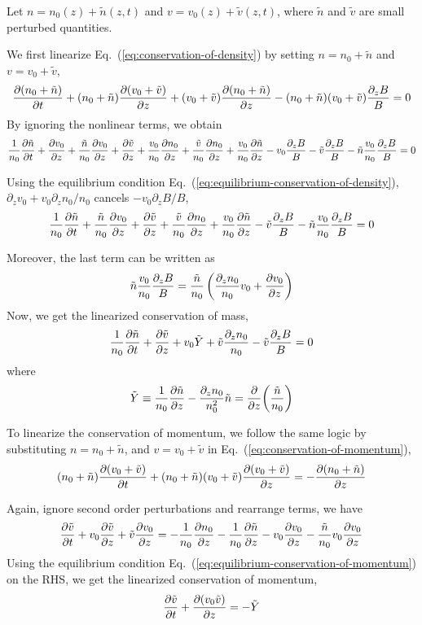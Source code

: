 Let $n = n_0(z) + \tilde{n}(z,t)$ and $v = v_0(z) + \tilde{v}(z,t)$, where $\tilde{n}$ and $\tilde{v}$ are small perturbed quantities.

We first linearize Eq.~(\ref{eq:conservation-of-density}) by setting $n=n_0+\tilde{n}$ and $v=v_0+\tilde{v}$,
\[    \pdv{(n_0+\tilde{n})}{t}
	+ (n_0+\tilde{n})\pdv{(v_0+\tilde{v})}{z}
	+ (v_0+\tilde{v})\pdv{(n_0+\tilde{n})}{z}
	- (n_0+\tilde{n})(v_0+\tilde{v})\frac{\partial_z B}{B} = 0
\]
By ignoring the nonlinear terms, we obtain
\[ \frac{1}{n_0}\pdv{\tilde{n}}{t}
	+ \pdv{v_0}{z} + \frac{\tilde{n}}{n_0}\pdv{v_0}{z} + \pdv{\tilde{v}}{z}
	+ \frac{v_0}{n_0}\pdv{n_0}{z} + \frac{\tilde{v}}{n_0}\pdv{n_0}{z} + \frac{v_0}{n_0}\pdv{\tilde{n}}{z}
	- v_0\frac{\partial_z B}{B} - \tilde{v}\frac{\partial_z B}{B} - \tilde{n}\frac{v_0}{n_0}\frac{\partial_z B}{B} = 0
\]

Using the equilibrium condition Eq.~(\ref{eq:equilibrium-conservation-of-density}), $\partial_zv_0+v_0\partial_zn_0/n_0$ cancels $-v_0\partial_zB/B$,
\[ \frac{1}{n_0}\pdv{\tilde{n}}{t}
	+ \frac{\tilde{n}}{n_0}\pdv{v_0}{z} + \pdv{\tilde{v}}{z}
	+ \frac{\tilde{v}}{n_0}\pdv{n_0}{z} + \frac{v_0}{n_0}\pdv{\tilde{n}}{z}
	- \tilde{v}\frac{\partial_z B}{B} - \tilde{n}\frac{v_0}{n_0}\frac{\partial_z B}{B} = 0
\]

Moreover, the last term can be written as
\[ \tilde{n}\frac{v_0}{n_0}\frac{\partial_z B}{B} = \frac{\tilde{n}}{n_0}\left( \frac{\partial_z n_0}{n_0}v_0 + \pdv{v_0}{z} \right) \]
Now, we get the linearized conservation of mass,
\begin{equation} \label{eq:linearized-conservation-of-density}
	\frac{1}{n_0}\pdv{\tilde{n}}{t}
	+ \pdv{\tilde{v}}{z} + v_0\tilde{Y} + \tilde{v}\frac{\partial_z n_0}{n_0} - \tilde{v}\frac{\partial_z B}{B} = 0
\end{equation}
where
\[ \tilde{Y} \equiv \frac{1}{n_0}\pdv{\tilde{n}}{z} - \frac{\partial_z n_0}{n_0^2}\tilde{n} = \pdv{z}(\frac{\tilde{n}}{n_0}) \]

To linearize the conservation of momentum, we follow the same logic by substituting $n=n_0+\tilde{n}$, and $v=v_0+\tilde{v}$ in Eq.~(\ref{eq:conservation-of-momentum}),
\[ (n_0+\tilde{n})\pdv{(v_0+\tilde{v})}{t} + (n_0+\tilde{n})(v_0+\tilde{v})\pdv{(v_0+\tilde{v})}{z} = -\pdv{(n_0+\tilde{n})}{z} \]

Again, ignore second order perturbations and rearrange terms, we have
\[ \pdv{\tilde{v}}{t} + v_0\pdv{\tilde{v}}{z} + \tilde{v}\pdv{v_0}{z}
	= -\frac{1}{n_0}\pdv{n_0}{z} -\frac{1}{n_0}\pdv{\tilde{n}}{z} -v_0\pdv{v_0}{z} - \frac{\tilde{n}}{n_0}v_0\pdv{v_0}{z} \]
Using the equilibrium condition Eq.~(\ref{eq:equilibrium-conservation-of-momentum}) on the RHS, we get the linearized conservation of momentum,
\begin{equation} \label{eq:linearized-conservation-of-momentum}
	\pdv{\tilde{v}}{t} + \pdv{(v_0\tilde{v})}{z} = -\tilde{Y}
\end{equation}

